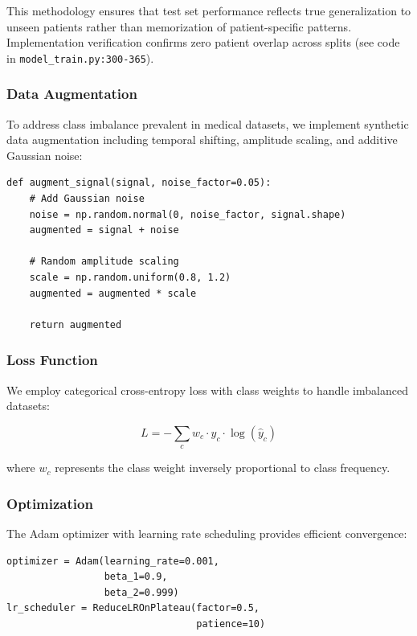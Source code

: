 \documentclass[conference]{IEEEtran}
\begin{document}
This methodology ensures that test set performance reflects true generalization to unseen patients rather than memorization of patient-specific patterns. Implementation verification confirms zero patient overlap across splits (see code in \texttt{model\_train.py:300-365}).

\subsubsection{Data Augmentation}
To address class imbalance prevalent in medical datasets, we implement synthetic data augmentation including temporal shifting, amplitude scaling, and additive Gaussian noise:

\begin{lstlisting}[caption={Data augmentation implementation},label={lst:augment}]
def augment_signal(signal, noise_factor=0.05):
    # Add Gaussian noise
    noise = np.random.normal(0, noise_factor, signal.shape)
    augmented = signal + noise
    
    # Random amplitude scaling
    scale = np.random.uniform(0.8, 1.2)
    augmented = augmented * scale
    
    return augmented
\end{lstlisting}

\subsubsection{Loss Function}
We employ categorical cross-entropy loss with class weights to handle imbalanced datasets:

\begin{equation}
L = -\sum_{c} w_c \cdot y_c \cdot \log(\hat{y}_c)
\label{eq:loss}
\end{equation}

where $w_c$ represents the class weight inversely proportional to class frequency.

\subsubsection{Optimization}
The Adam optimizer with learning rate scheduling provides efficient convergence:

\begin{lstlisting}[caption={Optimizer configuration},label={lst:optimizer}]
optimizer = Adam(learning_rate=0.001, 
                 beta_1=0.9, 
                 beta_2=0.999)
lr_scheduler = ReduceLROnPlateau(factor=0.5, 
                                 patience=10)
\end{lstlisting}
\end{document}

